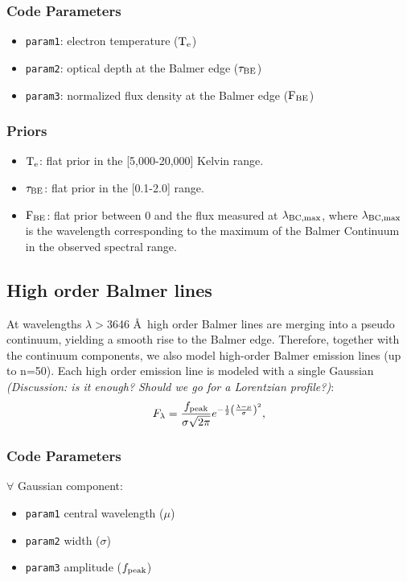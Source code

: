 \documentclass[12pt,letterpaper]{article}
\begin{document}
\subsubsection*{Code Parameters}
\begin{itemize}
    \item {\tt param1}: electron temperature (${\rm T}_{{\rm e}}$)
    \item {\tt param2}: optical depth at the Balmer edge ($\tau_{\rm{BE}}$)
    \item {\tt param3}: normalized flux density at the Balmer edge ($\rm{F}_{\rm{BE}}$)
\end{itemize}

\subsubsection*{Priors}
\begin{itemize}
    \item {\tt ${\rm T}_{{\rm e}}$}: flat prior in the [5,000-20,000] Kelvin range.
    \item {\tt $\tau_{\rm{BE}}$}: flat prior in the [0.1-2.0] range.    
    \item {\tt $\rm{F}_{\rm{BE}}$}: flat prior between 0 and the flux measured at $\lambda_{\rm BC,max}$, where $\lambda_{\rm BC,max}$ is the wavelength 
      corresponding to the maximum of the Balmer Continuum in the observed spectral range.       
\end{itemize}

\subsection*{High order Balmer lines}

At wavelengths $\lambda>$3646 \AA \ high order Balmer lines are merging into a pseudo continuum, yielding a smooth rise to the Balmer edge. 
Therefore, together with the continuum components, we also model high-order Balmer emission lines (up to n=50). Each high order emission line is modeled with a single 
Gaussian \textit{(Discussion: is it enough? Should we go for a Lorentzian profile?)}:
\begin{equation} F_{\lambda} = \frac{f_{\rm peak}}{\sigma \sqrt{2\pi}}e^{-\frac{1}{2}\left(\frac{\lambda - \mu}{\sigma}\right)^2},
\end{equation}

\subsubsection*{Code Parameters}
$\forall$ Gaussian component:
\begin{itemize}	
      \item{\tt param1} central wavelength ($\mu$)
      \item{\tt param2} width ($\sigma$)
      \item{\tt param3} amplitude ($f_{\rm peak}$)	    
\end{itemize}
\end{document}
